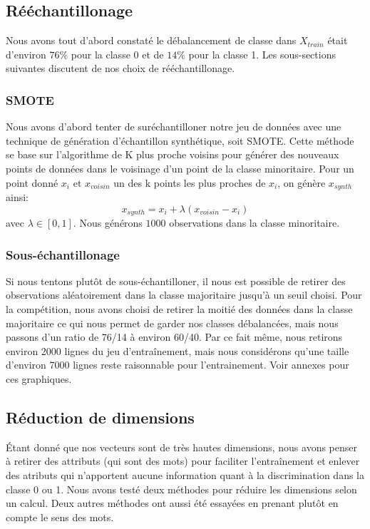 \documentclass{article}
\begin{document}
\subsection{Rééchantillonage}
Nous avons tout d'abord constaté le débalancement de classe dans $X_{train}$ était d'environ $76\%$ pour la classe 0 et de $14\%$ pour la classe 1. Les sous-sections suivantes discutent de nos choix de rééchantillonage.
\subsubsection{SMOTE}
Nous avons d'abord tenter de suréchantilloner notre jeu de données avec une technique de génération d'échantillon synthétique, soit SMOTE. Cette méthode se base sur l'algorithme de K plus proche voisins pour générer des nouveaux points de données dans le voisinage d'un point de la classe minoritaire. Pour un point donné $x_i$ et $x_{voisin}$ un des k points les plus proches de $x_i$, on génère $x_{synth}$ ainsi:\\
$$x_{synth} = x_i + \lambda (x_{voisin} - x_i)$$ avec $\lambda \in [0, 1]$.
Nous générons $1000$ observations dans la classe minoritaire.
\subsubsection{Sous-échantillonage}
Si nous tentons plutôt de sous-échantilloner, il nous est possible de retirer des observations aléatoirement dans la classe majoritaire jusqu'à un seuil choisi. Pour la compétition, nous avons choisi de retirer la moitié des données dans la classe majoritaire ce qui nous permet de garder nos classes débalancées, mais nous passons d'un ratio de 76/14 à environ 60/40. Par ce fait même, nous retirons environ 2000 lignes du jeu d'entraînement, mais nous considérons qu'une taille d'environ 7000 lignes reste raisonnable pour l'entrainement. Voir annexes pour ces graphiques.
\subsection{Réduction de dimensions}
Étant donné que nos vecteurs sont de très hautes dimensions, nous avons penser à retirer des attributs (qui sont des mots) pour faciliter l'entraînement et enlever des atributs qui n'apportent aucune information quant à la discrimination dans la classe 0 ou 1. Nous avons testé deux méthodes pour réduire les dimensions selon un calcul. Deux autres méthodes ont aussi été essayées en prenant plutôt en compte le sens des mots.
\end{document}
